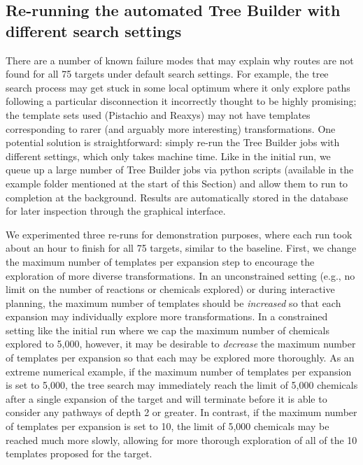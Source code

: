 \documentclass[pdflatex,sn-mathphys-num]{sn-jnl}%
\theoremstyle{thmstyleone}%
\theoremstyle{thmstyletwo}%
\theoremstyle{thmstylethree}%
\begin{document}
\clearpage

\subsection{Re-running the automated Tree Builder with different search settings}

There are a number of known failure modes that may explain why routes are not found for all 75 targets under default search settings. For example, the tree search process may get stuck in some local optimum where it only explore paths following a particular disconnection it incorrectly thought to be highly promising; the template sets used (Pistachio and Reaxys) may not have templates corresponding to rarer (and arguably more interesting) transformations. One potential solution is straightforward: simply re-run the Tree Builder jobs with different settings, which only takes machine time. Like in the initial run, we queue up a large number of Tree Builder jobs via python scripts (available in the example folder mentioned at the start of this Section) and allow them to run to completion at the background. Results are automatically stored in the database for later inspection through the graphical interface.

We experimented three re-runs for demonstration purposes, where each run took about an hour to finish for all 75 targets, similar to the baseline. First, we change the maximum number of templates per expansion step to encourage the exploration of more diverse transformations. In an unconstrained setting (e.g., no limit on the number of reactions or chemicals explored) or during interactive planning, the maximum number of templates should be \emph{increased} so that each expansion may individually explore more transformations. In a constrained setting like the initial run where we cap the maximum number of chemicals explored to 5,000, however, it may be desirable to \emph{decrease} the maximum number of templates per expansion so that each may be explored more thoroughly. As an extreme numerical example, if the maximum number of templates per expansion is set to 5,000, the tree search may immediately reach the limit of 5,000 chemicals after a single expansion of the target and will terminate before it is able to consider any pathways of depth 2 or greater. In contrast, if the maximum number of templates per expansion is set to 10, the limit of 5,000 chemicals may be reached much more slowly, allowing for more thorough exploration of all of the 10 templates proposed for the target.
\end{document}
